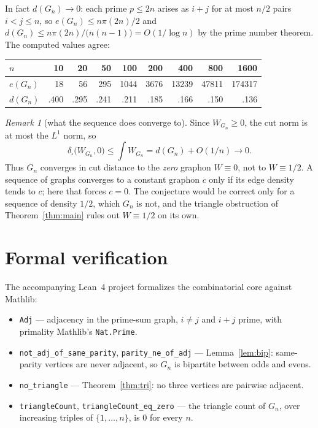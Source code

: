 \documentclass[11pt]{article}
\theoremstyle{plain}
\theoremstyle{remark}
\newtheorem{remark}[theorem]{Remark}
\newcommand{\dcut}{\delta_{\square}}
\begin{document}
In fact $d(G_n)\to0$: each prime $p\le2n$ arises as $i+j$ for at most $n/2$
pairs $i<j\le n$, so $e(G_n)\le n\pi(2n)/2$ and
$d(G_n)\le n\pi(2n)/\bigl(n(n-1)\bigr)=O(1/\log n)$ by the prime number
theorem. The computed values agree:

\begin{center}
\begin{tabular}{lrrrrrrrr}
\toprule
$n$ & 10 & 20 & 50 & 100 & 200 & 400 & 800 & 1600\\
\midrule
$e(G_n)$ & 18 & 56 & 295 & 1044 & 3676 & 13239 & 47811 & 174317\\
$d(G_n)$ & .400 & .295 & .241 & .211 & .185 & .166 & .150 & .136\\
\bottomrule
\end{tabular}
\end{center}

\begin{remark}[what the sequence does converge to]
Since $W_{G_n}\ge0$, the cut norm is at most the $L^1$ norm, so
\[
  \dcut\bigl(W_{G_n},0\bigr)\le\int W_{G_n}=d(G_n)+O(1/n)\longrightarrow0 .
\]
Thus $G_n$ converges in cut distance to the \emph{zero} graphon $W\equiv0$, not
to $W\equiv1/2$. A sequence of graphs converges to a constant graphon $c$ only
if its edge density tends to $c$; here that forces $c=0$. The conjecture would
be correct only for a sequence of density $1/2$, which $G_n$ is not, and the
triangle obstruction of Theorem~\ref{thm:main} rules out $W\equiv1/2$ on its
own.
\end{remark}

\section{Formal verification}

The accompanying Lean~4 project formalizes the combinatorial core against
Mathlib:

\begin{itemize}
  \item \texttt{Adj} --- adjacency in the prime-sum graph, $i\ne j$ and
    $i+j$ prime, with primality Mathlib's \texttt{Nat.Prime}.
  \item \texttt{not\_adj\_of\_same\_parity}, \texttt{parity\_ne\_of\_adj} ---
    Lemma~\ref{lem:bip}: same-parity vertices are never adjacent, so $G_n$ is
    bipartite between odds and evens.
  \item \texttt{no\_triangle} --- Theorem~\ref{thm:tri}: no three vertices are
    pairwise adjacent.
  \item \texttt{triangleCount}, \texttt{triangleCount\_eq\_zero} --- the
    triangle count of $G_n$, over increasing triples of $\{1,\ldots,n\}$, is
    $0$ for every $n$.
\end{itemize}
\end{document}
